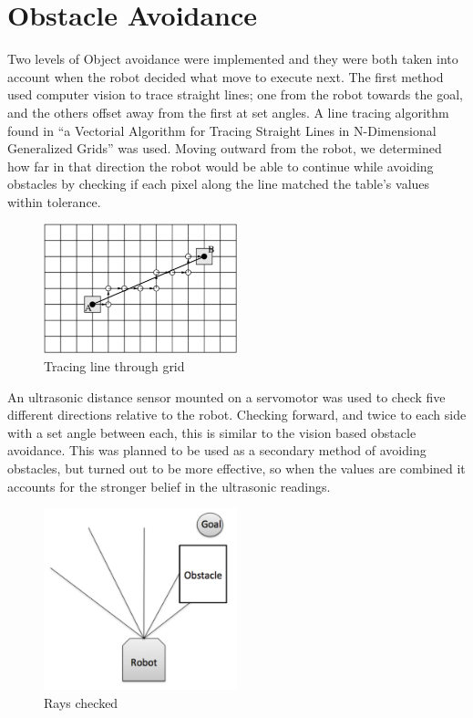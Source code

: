 \section{Obstacle Avoidance}
\label{section::avoidance}

Two levels of Object avoidance were implemented and they were both taken into account when the robot decided what move to execute next. The first method used computer vision to trace straight lines; one from the robot towards the goal, and the others offset away from the first at set angles. A line tracing algorithm found in ``a Vectorial Algorithm for Tracing Straight Lines in N-Dimensional Generalized Grids''\cite{linetrace} was used. Moving outward from the robot, we determined how far in that direction the robot would be able to continue while avoiding obstacles by checking if each pixel along the line matched the table's values within tolerance.

\begin{figure}[tbp]
  \centering
  \includegraphics[width=0.5\textwidth]{media/linetrace.pdf}
  \caption{\label{line-trace} Tracing line through grid}
\end{figure}

An ultrasonic distance sensor mounted on a servomotor was used to check five different directions relative to the robot. Checking forward, and twice to each side with a set angle between each, this is similar to the vision based obstacle avoidance. This was planned to be used as a secondary method of avoiding obstacles, but turned out to be more effective, so when the values are combined it accounts for the stronger belief in the ultrasonic readings.

\begin{figure}[tbp]
  \centering
  \includegraphics[width=0.5\textwidth]{media/rays.pdf}
  \caption{\label{policy-rays} Rays checked}
\end{figure}